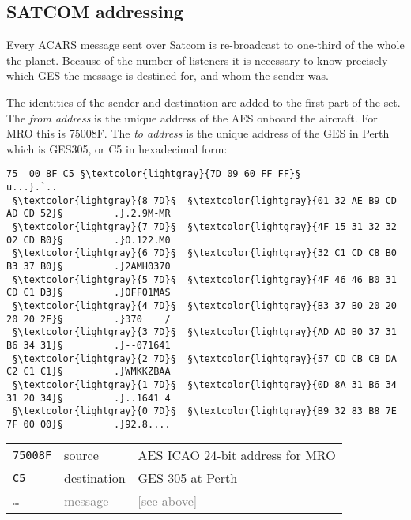 \documentclass[tikz,a4paper,12pt]{article}
\begin{document}
\subsection{SATCOM addressing}

Every ACARS message sent over Satcom is re-broadcast to one-third of
the whole the planet.  Because of the number of listeners it is necessary to
know precisely which \gls{GES} the message is destined for, and whom the sender
was.

The identities of the sender and destination are added to the first
part of the set.  The \emph{from address} is the unique address of the
\gls{AES} onboard the aircraft.  For \gls{MRO} this is \acrshort{75008F}.  The \emph{to address} is the unique
address of the \gls{GES} in Perth which is \acrshort{GES305}, or \acrshort{C5} in hexadecimal form:

\begin{lstlisting}[language=SATCOM,numbers=none]
   75  00 8F C5 §\textcolor{lightgray}{7D 09 60 FF FF}§          u...}.`..
 §\textcolor{lightgray}{8 7D}§  §\textcolor{lightgray}{01 32 AE B9 CD AD CD 52}§         .}.2.9M-MR
 §\textcolor{lightgray}{7 7D}§  §\textcolor{lightgray}{4F 15 31 32 32 02 CD B0}§         .}O.122.M0
 §\textcolor{lightgray}{6 7D}§  §\textcolor{lightgray}{32 C1 CD C8 B0 B3 37 B0}§         .}2AMH0370
 §\textcolor{lightgray}{5 7D}§  §\textcolor{lightgray}{4F 46 46 B0 31 CD C1 D3}§         .}OFF01MAS
 §\textcolor{lightgray}{4 7D}§  §\textcolor{lightgray}{B3 37 B0 20 20 20 20 2F}§         .}370    /
 §\textcolor{lightgray}{3 7D}§  §\textcolor{lightgray}{AD AD B0 37 31 B6 34 31}§         .}--071641
 §\textcolor{lightgray}{2 7D}§  §\textcolor{lightgray}{57 CD CB CB DA C2 C1 C1}§         .}WMKKZBAA
 §\textcolor{lightgray}{1 7D}§  §\textcolor{lightgray}{0D 8A 31 B6 34 31 20 34}§         .}..1641 4
 §\textcolor{lightgray}{0 7D}§  §\textcolor{lightgray}{B9 32 83 B8 7E 7F 00 00}§         .}92.8....
\end{lstlisting}

\begin{center}
\begin{tabular}{p{1.5cm}p{2cm}p{8cm}}
\hfill\texttt{75008F}&source&\acrshort{AES} \acrshort{ICAO} 24-bit address for \acrshort{MRO}\\
\hfill\texttt{C5}&destination&\acrshort{GES} 305 at Perth\\
\hline
\hfill\textcolor{gray}{\texttt{\ldots}}&\textcolor{gray}{message}&\textcolor{gray}{[see above]}\\
\end{tabular}
\end{center}
\end{document}
